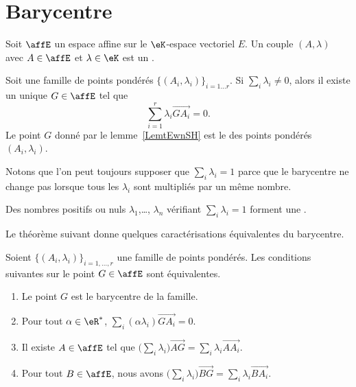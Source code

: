 \section{Barycentre}

Soit \( \affE\) un espace affine sur le \( \eK\)-espace vectoriel \( E\). Un couple \( (A,\lambda)\) avec \( A\in \affE\) et \( \lambda\in \eK\) est un .

\begin{lemmaDef}        \label{LemtEwnSH}
	Soit une famille de points pondérés \( \{ (A_i,\lambda_i) \}_{i=1\ldots r}\). Si \( \sum_i\lambda_i\neq 0\), alors il existe un unique \( G\in \affE\) tel que
	\begin{equation}
		\sum_{i=1}^r\lambda_i\overrightarrow{ GA_i }=0.
	\end{equation}
	Le point \( G\) donné par le lemme~\ref{LemtEwnSH} est le  des points pondérés \( (A_i,\lambda_i)\).
\end{lemmaDef}


Notons que l'on peut toujours supposer que \( \sum_i\lambda_i=1\) parce que le barycentre ne change pas lorsque tous les \( \lambda_i\) sont multipliés par un même nombre.
\begin{definition}\label{DefIMZooLFdIUB}
	Des nombres positifs ou nuls \( \lambda_1\),\ldots, \( \lambda_n\) vérifiant \( \sum_i\lambda_i=1\) forment une .
\end{definition}

Le théorème suivant donne quelques caractérisations équivalentes du barycentre.
\begin{theorem}      \label{ThoIJVzxr}
	Soient \( \{ (A_i,\lambda_i) \}_{i=1,\ldots, r}\) une famille de points pondérés. Les conditions suivantes sur le point \( G\in \affE\) sont équivalentes.
	\begin{enumerate}
		\item
		      Le point \( G\) est le barycentre de la famille.
		\item
		      Pour tout \( \alpha\in \eR^*\), \( \sum_i(\alpha\lambda_i)\overrightarrow{ GA_i }=0\).
		\item
		      Il existe \( A\in\affE\) tel que \( \big( \sum_i\lambda_i \big)\overrightarrow{ AG }=\sum_i\lambda_i\overrightarrow{ AA_i }\).
		\item   \label{ItemEgOQBX}
		      Pour tout \( B\in\affE\), nous avons \( \big( \sum_i\lambda_i \big)\overrightarrow{ BG }=\sum_i\lambda_i\overrightarrow{ BA_i }\).
	\end{enumerate}
\end{theorem}

